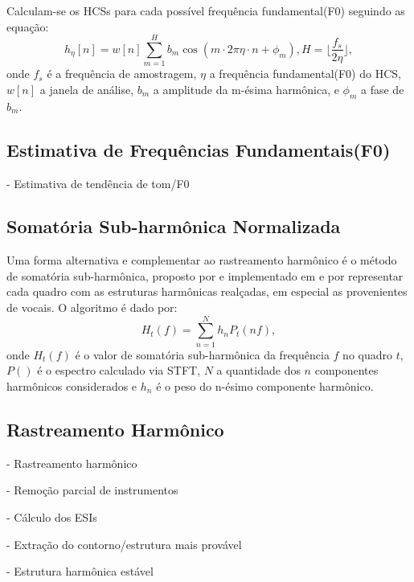 \documentclass[
	12pt,				%
	openright,			%
	oneside,			%
	a4paper,			%
	english,			%
	brazil,				%
	]{abntex2}
\begin{document}
Calculam-se os HCSs para cada possível frequência fundamental(F0) seguindo as equação:
\begin{equation}
    h_\eta [n] = w[n] \displaystyle\sum_{m = 1}^H b_m \cos(m \cdot 2\pi \eta \cdot n + \phi_m), H = \lfloor \frac{f_s}{2\eta} \rfloor, 
\end{equation}
onde $f_s$ é a frequência de amostragem, $\eta$ a frequência fundamental(F0) do HCS, $w[n]$ a janela de análise, $b_m$ a amplitude da m-ésima harmônica, e $\phi_m$ a fase de $b_m$.

\subsection{Estimativa de Frequências Fundamentais(F0)}
- Estimativa de tendência de tom/F0 

\subsection{Somatória Sub-harmônica Normalizada}
Uma forma alternativa e complementar ao rastreamento harmônico é o método de somatória sub-harmônica, proposto por  e implementado em  e  por representar cada quadro com as estruturas harmônicas realçadas, em especial as provenientes de vocais. O algoritmo é dado por:
\begin{equation}
    H_t(f) = \displaystyle\sum_{n = 1}^N h_n P_t(nf), 
\end{equation}
onde $H_t (f)$ é o valor de somatória sub-harmônica da frequência $f$ no quadro $t$, $P()$ é o espectro calculado via STFT, $N$ a quantidade dos $n$ componentes harmônicos considerados e $h_n$ é o peso do n-ésimo componente harmônico.

\subsection{Rastreamento Harmônico}
- Rastreamento harmônico 

- Remoção parcial de instrumentos 

- Cálculo dos ESIs 

- Extração do contorno/estrutura mais provável 

- Estrutura harmônica estável 
\end{document}
